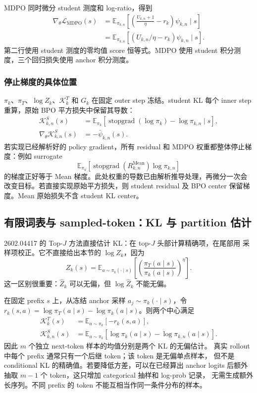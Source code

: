 MDPO 同时微分 student 测度和 log-ratio，得到
\begin{align}
\nabla_\theta\mathcal L_{\mathrm{MDPO}}(s)
&=\mathbb E_{\pi_{k,n}}\left[\left(\frac{U_{k,n}+1}\eta-r_k\right)\psi_{k,n}\mid s\right]\\
&=\mathbb E_{\pi_{k,n}}[(U_{k,n}/\eta-r_k)\psi_{k,n}\mid s].
\end{align}
第二行使用 student 测度的零均值 score 恒等式。MDPO 使用 student 积分测度，三个回归损失使用 anchor 积分测度。

\subsubsection*{停止梯度的具体位置}
$\pi_k$、$\pi_T$、$\log Z_k$、$\mathcal K_k^{T}$ 和 $G_k$ 在固定 outer step 冻结。student KL 每个 inner step 重算，原始 BPO 平方损失中保留其导数：
\begin{align}
\mathcal K_{k,n}^{S}(s)&=\mathbb E_{\pi_k}[\operatorname{stopgrad}(\log\pi_k)-\log\pi_{k,n}\mid s],\\
\nabla_\theta\mathcal K_{k,n}^{S}(s)&=-\bar\psi_{k,n}(s).
\label{eq:ch2-opd-grad-ktheta}
\end{align}
若实现已经解析好的 policy gradient，所有 residual 和 MDPO 权重都整体停止梯度：例如 surrogate
\[
\mathbb E_{\pi_k}[\operatorname{stopgrad}(R_{k,n}^{\mathrm{Mean}})\log\pi_{k,n}]
\]
的梯度正好等于 Mean 梯度。此处权重的导数已由解析推导处理，再微分一次会改变目标。若直接实现原始平方损失，则 student residual 及 BPO center 保留梯度。Mean 原始损失不含 student KL center。

\subsection{有限词表与 sampled-token：KL 与 partition 估计}
\label{sec:ch2-opd-z-kl-estimation}

2602.04417 的 Top-$J$ 方法直接估计 KL：在 top-$J$ 头部计算精确项，在尾部用
采样项校正。它不直接给出本节的 $\log Z_k$，因为
\begin{equation}
Z_k(s)=\mathbb E_{a\sim\pi_k(\cdot\mid s)}
\left[\left(\frac{\pi_T(a\mid s)}{\pi_k(a\mid s)}\right)^\eta\right].
\label{eq:ch2-opd-z-importance}
\end{equation}
这一区别很重要：$\widehat Z_k$ 可以无偏，但 $\log\widehat Z_k$ 不能无偏。

在固定 prefix $s$ 上，从冻结 anchor 采样 $a_j\sim\pi_k(\cdot\mid s)$，令
$r_k(s,a)=\log \pi_T(a\mid s)-\log\pi_k(a\mid s)$。则两个中心满足
\begin{align}
\mathcal K_k^{T}(s)&=\mathbb E_{a\sim\pi_k}[-r_k(s,a)],\\
\mathcal K_{k,n}^{S}(s)&=\mathbb E_{a\sim\pi_k}
\left[\log\pi_k(a\mid s)-\log\pi_{k,n}(a\mid s)\right].
\end{align}
因此 $m$ 个独立 next-token 样本的均值分别是两个 KL 的无偏估计。
真实 rollout 中每个 prefix 通常只有一个后继 token；该 token 是无偏单点样本，
但不是 conditional KL 的精确值。若要降低方差，可以在已经算出 anchor logits
后额外抽取 $m-1$ 个 token，这只增加 categorical 抽样和 log-prob 记录，
无需生成额外长序列。不同 prefix 的 token 不能互相当作同一条件分布的样本。

